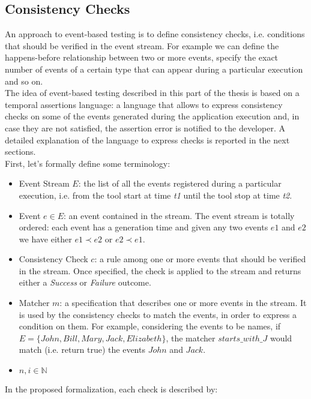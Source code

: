 \documentclass[11pt,a4paper,notitlepage]{article}
\begin{document}
\subsection{Consistency Checks}
An approach to event-based testing is to define consistency checks, i.e. conditions that should be verified in the event stream. For example we can define the happens-before relationship between two or more events, specify the exact number of events of a certain type that can appear during a particular execution and so on.\medskip \\
The idea of event-based testing described in this part of the thesis is based on a temporal assertions language: a language that allows to express consistency checks on some of the events generated during the application execution and, in case they are not satisfied, the assertion error is notified to the developer. A detailed explanation of the language to express checks is reported in the next sections.\bigskip \\
First, let's formally define some terminology:
\begin{itemize}
	\item Event Stream $E$: the list of all the events registered during a particular execution, i.e. from the tool start at time \textit{t1} until the tool stop at time \textit{t2}.
	\item Event $e \in E$: an event contained in the stream. The event stream is totally ordered: each event has a generation time and given any two events $e1$ and $e2$ we have either $e1 \prec e2$ or $e2 \prec e1$.
	\item Consistency Check $c$: a rule among one or more events that should be verified in the stream. Once specified, the check is applied to the stream and returns either a \textit{Success} or \textit{Failure} outcome.
	\item Matcher $m$: a specification that describes one or more events in the stream. It is used by the consistency checks to match the events, in order to express a condition on them. For example, considering the events to be names, if $E= \big\{ John, Bill, Mary, Jack, Elizabeth \big\} $, the matcher $starts\_with\_J$ would match (i.e. return true) the events $John$ and $Jack$.
	\item $n, i \in \mathbb{N}$
\end{itemize}\medskip
In the proposed formalization, each check is described by:
\end{document}
